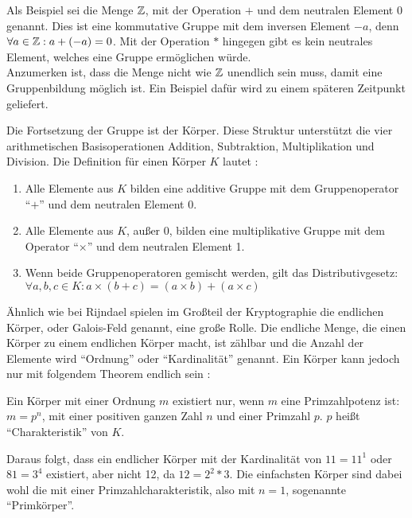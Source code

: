  Als Beispiel sei die Menge $\mathbb{Z}$, mit der Operation $+$ und dem neutralen Element $0$ genannt.
 Dies ist eine kommutative Gruppe mit dem inversen Element $-a$, denn $\forall a \in \mathbb{Z}: a + (-a) = 0$.
 Mit der Operation $*$ hingegen gibt es kein neutrales Element, welches eine Gruppe ermöglichen
 würde. \\
 Anzumerken ist, dass die Menge nicht wie $\mathbb{Z}$ unendlich sein muss, damit eine Gruppenbildung
 möglich ist. Ein Beispiel dafür wird zu einem späteren Zeitpunkt geliefert.
 
 Die Fortsetzung der Gruppe ist der Körper. Diese Struktur unterstützt die vier arithmetischen Basisoperationen
 Addition, Subtraktion, Multiplikation und Division. Die Definition für einen Körper $K$ lautet \cite{paar10}:

 \begin{enumerate}
 	\item Alle Elemente aus $K$ bilden eine additive Gruppe mit dem Gruppenoperator ``$+$'' und dem neutralen Element 0.
	\item Alle Elemente aus $K$, außer 0, bilden eine multiplikative Gruppe mit dem Operator ``$\times$'' und dem neutralen Element 1.
	\item Wenn beide Gruppenoperatoren gemischt werden, gilt das Distributivgesetz: \\
		$\forall a, b, c \in K: a \times (b + c) = (a \times b) + (a \times c)$
 \end{enumerate}

 Ähnlich wie bei Rijndael spielen im Großteil der Kryptographie die endlichen Körper, oder Galois-Feld genannt,
 eine große Rolle. Die endliche Menge, die einen Körper zu einem endlichen Körper macht, ist zählbar und
 die Anzahl der Elemente wird ``Ordnung'' oder ``Kardinalität'' genannt. Ein Körper kann jedoch nur
 mit folgendem Theorem endlich sein \cite{paar10}:
 
 \begin{center}
  \parbox{12cm}{\centering
   Ein Körper mit einer Ordnung $m$ existiert nur, wenn $m$ eine Primzahlpotenz ist:
   $m = p^n$, mit einer positiven ganzen Zahl $n$ und einer Primzahl $p$. $p$ heißt ``Charakteristik''
   von $K$.
  }
 \end{center} 
 
 Daraus folgt, dass ein endlicher Körper mit der Kardinalität von $11 = 11^1$ oder $81 = 3^4$ existiert, aber
 nicht 12, da $12 = 2^2 * 3$. Die einfachsten Körper sind dabei wohl die mit einer Primzahlcharakteristik, also
 mit $n = 1$, sogenannte ``Primkörper''.
 
